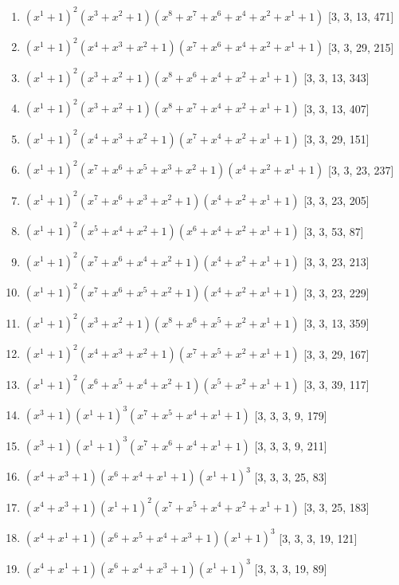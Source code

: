 \documentclass[10pt,twocolumn]{article}
\begin{document}
\begin{enumerate}
\item $(x^{1} + 1)^{2}(x^{3} + x^{2} + 1)(x^{8} + x^{7} + x^{6} + x^{4} + x^{2} + x^{1} + 1)$  [3, 3, 13, 471]
\item $(x^{1} + 1)^{2}(x^{4} + x^{3} + x^{2} + 1)(x^{7} + x^{6} + x^{4} + x^{2} + x^{1} + 1)$  [3, 3, 29, 215]
\item $(x^{1} + 1)^{2}(x^{3} + x^{2} + 1)(x^{8} + x^{6} + x^{4} + x^{2} + x^{1} + 1)$  [3, 3, 13, 343]
\item $(x^{1} + 1)^{2}(x^{3} + x^{2} + 1)(x^{8} + x^{7} + x^{4} + x^{2} + x^{1} + 1)$  [3, 3, 13, 407]
\item $(x^{1} + 1)^{2}(x^{4} + x^{3} + x^{2} + 1)(x^{7} + x^{4} + x^{2} + x^{1} + 1)$  [3, 3, 29, 151]
\item $(x^{1} + 1)^{2}(x^{7} + x^{6} + x^{5} + x^{3} + x^{2} + 1)(x^{4} + x^{2} + x^{1} + 1)$  [3, 3, 23, 237]
\item $(x^{1} + 1)^{2}(x^{7} + x^{6} + x^{3} + x^{2} + 1)(x^{4} + x^{2} + x^{1} + 1)$  [3, 3, 23, 205]
\item $(x^{1} + 1)^{2}(x^{5} + x^{4} + x^{2} + 1)(x^{6} + x^{4} + x^{2} + x^{1} + 1)$  [3, 3, 53, 87]
\item $(x^{1} + 1)^{2}(x^{7} + x^{6} + x^{4} + x^{2} + 1)(x^{4} + x^{2} + x^{1} + 1)$  [3, 3, 23, 213]
\item $(x^{1} + 1)^{2}(x^{7} + x^{6} + x^{5} + x^{2} + 1)(x^{4} + x^{2} + x^{1} + 1)$  [3, 3, 23, 229]
\item $(x^{1} + 1)^{2}(x^{3} + x^{2} + 1)(x^{8} + x^{6} + x^{5} + x^{2} + x^{1} + 1)$  [3, 3, 13, 359]
\item $(x^{1} + 1)^{2}(x^{4} + x^{3} + x^{2} + 1)(x^{7} + x^{5} + x^{2} + x^{1} + 1)$  [3, 3, 29, 167]
\item $(x^{1} + 1)^{2}(x^{6} + x^{5} + x^{4} + x^{2} + 1)(x^{5} + x^{2} + x^{1} + 1)$  [3, 3, 39, 117]
\item $(x^{3} + 1)(x^{1} + 1)^{3}(x^{7} + x^{5} + x^{4} + x^{1} + 1)$  [3, 3, 3, 9, 179]
\item $(x^{3} + 1)(x^{1} + 1)^{3}(x^{7} + x^{6} + x^{4} + x^{1} + 1)$  [3, 3, 3, 9, 211]
\item $(x^{4} + x^{3} + 1)(x^{6} + x^{4} + x^{1} + 1)(x^{1} + 1)^{3}$  [3, 3, 3, 25, 83]
\item $(x^{4} + x^{3} + 1)(x^{1} + 1)^{2}(x^{7} + x^{5} + x^{4} + x^{2} + x^{1} + 1)$  [3, 3, 25, 183]
\item $(x^{4} + x^{1} + 1)(x^{6} + x^{5} + x^{4} + x^{3} + 1)(x^{1} + 1)^{3}$  [3, 3, 3, 19, 121]
\item $(x^{4} + x^{1} + 1)(x^{6} + x^{4} + x^{3} + 1)(x^{1} + 1)^{3}$  [3, 3, 3, 19, 89]

\end{enumerate}
\end{document}
